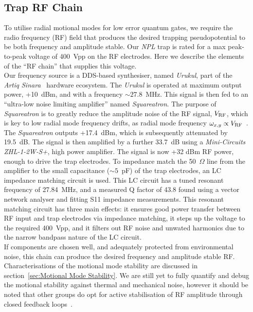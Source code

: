 \subsection{Trap RF Chain}
\label{sec:Trap RF Chain}
    To utilise radial motional modes for low error quantum gates, we require the
    radio frequency (RF) field that produces the desired trapping
    pseudopotential to be both frequency and amplitude stable. Our \emph{NPL}
    trap is rated for a max peak-to-peak voltage of 400~Vpp on the RF
    electrodes. Here we describe the elements of the ``RF chain'' that supplies
    this voltage. \\
    Our frequency source is a DDS-based synthesiser, named \emph{Urukul}, part
    of the \emph{Artiq Sinara}~\cite{kasprowicz2020artiq} hardware ecosystem. The
    \emph{Urukul} is operated at maximum output power, +10~dBm, and with a frequency $\sim 27.8$~MHz. This
    signal is then fed to an ``ultra-low noise limiting amplifier'' named
    \emph{Squareatron}. The purpose of \emph{Squareatron} is to
    greatly reduce the amplitude noise of the RF signal, $V_{\rm RF}$, which is
    key to low radial mode frequency drifts, as radial mode frequency $\omega_{x,y} \propto V_{\rm RF}$~\cite{wineland1998experimental}. The \emph{Squareatron} outputs +17.4~dBm,
    which is subsequently attenuated by 19.5~dB. The signal is then amplified by a
    further 33.7~dB using a \emph{Mini-Circuits ZHL-1-2W-S+}, high power
    amplifier. The signal is now +32 dBm RF power, enough to drive the trap
    electrodes. To impedance match the 50~$\Omega$ line from the amplifier to
    the small capacitance ($\sim 5$~pF) of the trap electrodes, an LC
    impedance matching circuit is used. This LC circuit has a tuned resonant frequency of 27.84~MHz, and a
    measured Q factor of 43.8 found using a vector network analyser and fitting S11 impedance measurements.
    This resonant matching circuit has three main effects: it ensures good power transfer
    between RF input and trap electrodes via impedance matching, it steps up the
    voltage to the required 400~Vpp, and it filters out RF noise and unwated harmonics due to
    the narrow bandpass nature of the LC circuit. \\
    If components are chosen well, and adequately protected from
    environmental noise, this chain can produce the desired frequency and
    amplitude stable RF. Characterisations of the motional mode
    stability are discussed in section~\ref{sec:Motional Mode Stability}. We are
    still yet to fully quantify and debug the motional stability against thermal
    and mechanical noise, however it should be noted that other groups do opt
    for active stabilisation of RF amplitude through closed feedback loops~\cite{milne2021construction}.\\

